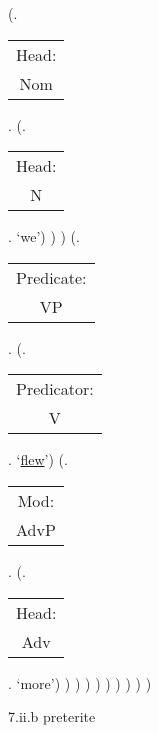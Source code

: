 \documentclass[12pt,letterpaper]{article}
\begin{document}
\begin{figure}
\begin{center}
\begin{parsetree}
			(.\begin{tabular}{c}Head:\\Nom\end{tabular}.
			(.\begin{tabular}{c}Head:\\N\end{tabular}. `we')
			)
			)
			(.\begin{tabular}{c}Predicate:\\VP\end{tabular}.
			(.\begin{tabular}{c}Predicator:\\V\end{tabular}. `\underline{flew}')
			(.\begin{tabular}{c}Mod:\\AdvP\end{tabular}. 
			(.\begin{tabular}{c}Head:\\Adv\end{tabular}. `more')
			)
			)
			)
			)
			)
			)
			)
			)
			) 
			
		\end{parsetree}
		\hfill \break \hfill \break
		7.ii.b preterite
	\end{center}
\end{figure}
\end{document}
